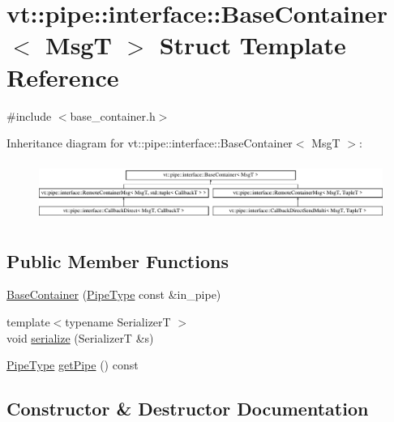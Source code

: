 \hypertarget{structvt_1_1pipe_1_1interface_1_1_base_container}{}\section{vt\+:\+:pipe\+:\+:interface\+:\+:Base\+Container$<$ MsgT $>$ Struct Template Reference}
\label{structvt_1_1pipe_1_1interface_1_1_base_container}


{\ttfamily \#include $<$base\+\_\+container.\+h$>$}

Inheritance diagram for vt\+:\+:pipe\+:\+:interface\+:\+:Base\+Container$<$ MsgT $>$\+:\begin{figure}[H]
\begin{center}
\leavevmode
\includegraphics[height=1.931035cm]{structvt_1_1pipe_1_1interface_1_1_base_container}
\end{center}
\end{figure}
\subsection*{Public Member Functions}
\begin{DoxyCompactItemize}
\item 
\hyperlink{structvt_1_1pipe_1_1interface_1_1_base_container_a096a87229f8c5b3b3bd0cca47cc7f45a}{Base\+Container} (\hyperlink{namespacevt_ac9852acda74d1896f48f406cd72c7bd3}{Pipe\+Type} const \&in\+\_\+pipe)
\item 
{\footnotesize template$<$typename SerializerT $>$ }\\void \hyperlink{structvt_1_1pipe_1_1interface_1_1_base_container_af042ddd27d8c1d683af861e2d12e0940}{serialize} (SerializerT \&s)
\item 
\hyperlink{namespacevt_ac9852acda74d1896f48f406cd72c7bd3}{Pipe\+Type} \hyperlink{structvt_1_1pipe_1_1interface_1_1_base_container_a5301aebfd709a96a3de5e03218c9300f}{get\+Pipe} () const
\end{DoxyCompactItemize}


\subsection{Constructor \& Destructor Documentation}
\mbox{\label{structvt_1_1pipe_1_1interface_1_1_base_container_a096a87229f8c5b3b3bd0cca47cc7f45a}} 
